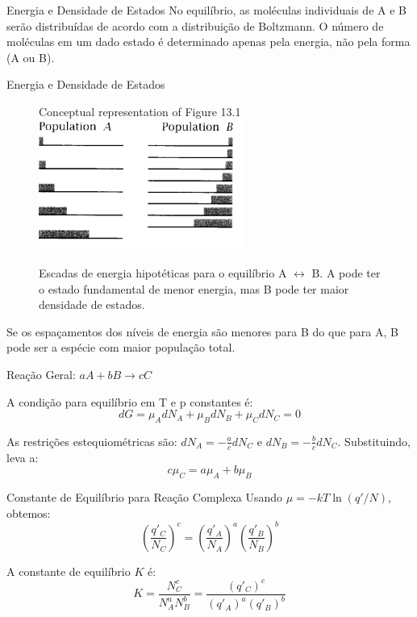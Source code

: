 \documentclass{beamer}
\begin{document}
\begin{frame}{Energia e Densidade de Estados}
        No equilíbrio, as moléculas individuais de A e B serão distribuídas de acordo com a distribuição de Boltzmann. O número de moléculas em um dado estado é determinado apenas pela energia, não pela forma (A ou B).


\end{frame}
\begin{frame}{Energia e Densidade de Estados}
        \begin{figure}
        \centering
         Conceptual representation of Figure 13.1
        \includegraphics[width=0.6\textwidth]{figs/energylevels.png}
        \caption{Escadas de energia hipotéticas para o equilíbrio A $\leftrightarrow$ B. A pode ter o estado fundamental de menor energia, mas B pode ter maior densidade de estados.}
        \end{figure}
        Se os espaçamentos dos níveis de energia são menores para B do que para A, B pode ser a espécie com maior população total.
\end{frame}

\begin{frame}{Reação Geral: $aA + bB \rightarrow cC$}
        
        A condição para equilíbrio em T e p constantes é:
        $$ dG = \mu_A dN_A + \mu_B dN_B + \mu_C dN_C = 0 $$
         
        As restrições estequiométricas são:
        $ dN_A = -\frac{a}{c}dN_C $ e $ dN_B = -\frac{b}{c}dN_C $. 
        Substituindo, leva a:
        $$ c\mu_C = a\mu_A + b\mu_B $$
        
\end{frame}

\begin{frame}{Constante de Equilíbrio para Reação Complexa}
        Usando $\mu = -kT \ln(q'/N)$, obtemos:
        $$ \left(\frac{q'_C}{N_C}\right)^c = \left(\frac{q'_A}{N_A}\right)^a \left(\frac{q'_B}{N_B}\right)^b $$
         
        A constante de equilíbrio $K$ é:
        $$ K = \frac{N_C^c}{N_A^a N_B^b} = \frac{(q'_C)^c}{(q'_A)^a (q'_B)^b} $$
        
\end{frame}
\end{document}
